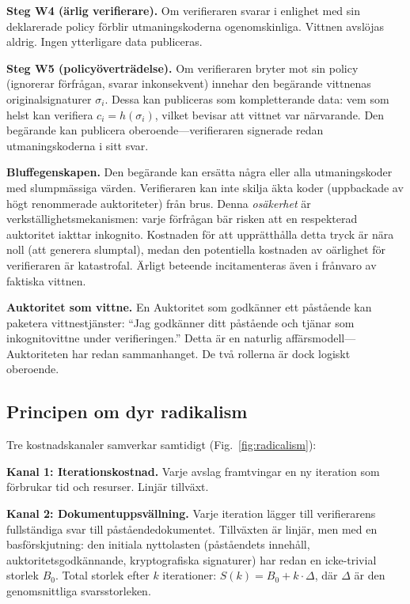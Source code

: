 \documentclass[11pt,a4paper,twocolumn]{article}
\begin{document}
\textbf{Steg W4 (ärlig verifierare).} Om verifieraren svarar i enlighet med sin deklarerade policy förblir utmaningskoderna ogenomskinliga. Vittnen avslöjas aldrig. Ingen ytterligare data publiceras.

\textbf{Steg W5 (policyöverträdelse).} Om verifieraren bryter mot sin policy (ignorerar förfrågan, svarar inkonsekvent) innehar den begärande vittnenas originalsignaturer $\sigma_i$. Dessa kan publiceras som kompletterande data: vem som helst kan verifiera $c_i = h(\sigma_i)$, vilket bevisar att vittnet var närvarande. Den begärande kan publicera oberoende---verifieraren signerade redan utmaningskoderna i sitt svar.

\textbf{Bluffegenskapen.} Den begärande kan ersätta några eller alla utmaningskoder med slumpmässiga värden. Verifieraren kan inte skilja äkta koder (uppbackade av högt renommerade auktoriteter) från brus. Denna \emph{osäkerhet} är verkställighetsmekanismen: varje förfrågan bär risken att en respekterad auktoritet iakttar inkognito. Kostnaden för att upprätthålla detta tryck är nära noll (att generera slumptal), medan den potentiella kostnaden av oärlighet för verifieraren är katastrofal. Ärligt beteende incitamenteras även i frånvaro av faktiska vittnen.

\textbf{Auktoritet som vittne.} En Auktoritet som godkänner ett påstående kan paketera vittnestjänster: ``Jag godkänner ditt påstående och tjänar som inkognitovittne under verifieringen.'' Detta är en naturlig affärsmodell---Auktoriteten har redan sammanhanget. De två rollerna är dock logiskt oberoende.

\subsection{Principen om dyr radikalism}

Tre kostnadskanaler samverkar samtidigt (Fig.~\ref{fig:radicalism}):

\textbf{Kanal 1: Iterationskostnad.} Varje avslag framtvingar en ny iteration som förbrukar tid och resurser. Linjär tillväxt.

\textbf{Kanal 2: Dokumentuppsvällning.} Varje iteration lägger till verifierarens fullständiga svar till påståendedokumentet. Tillväxten är linjär, men med en basförskjutning: den initiala nyttolasten (påståendets innehåll, auktoritetsgodkännande, kryptografiska signaturer) har redan en icke-trivial storlek $B_0$. Total storlek efter $k$ iterationer: $S(k) = B_0 + k \cdot \Delta$, där $\Delta$ är den genomsnittliga svarsstorleken.
\end{document}
